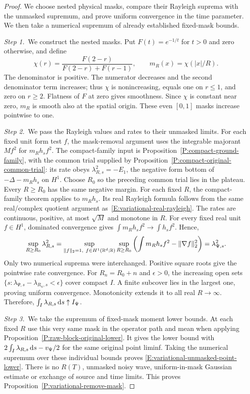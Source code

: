 \begin{proof}
  We choose nested physical masks, compare their Rayleigh suprema with the
  unmasked supremum, and prove uniform convergence in the time parameter. We
  then take a numerical supremum of already established fixed-mask bounds.


  \medskip
  \noindent\textit{Step 1.~}We construct the nested masks.
  Put $F(t) = e^{-1/t}$ for $t > 0$ and zero otherwise, and define
  \[
    \chi(r)=\frac{F(2-r)}{F(2-r)+F(r-1)},\qquad
    m_R(x)=\chi(|x|/R).
  \]
  The denominator is positive. The numerator decreases and the second
  denominator term increases; thus $\chi$ is nonincreasing, equals one on $r \le
  1$, and zero on $r \ge 2$. Flatness of $F$ at zero gives smoothness. Since
  $\chi$ is constant near zero, $m_R$ is smooth also at the spatial origin.
  These even $[0,1]$ masks increase pointwise to one.


  \medskip
  \noindent\textit{Step 2.~}We pass the Rayleigh values and rates to their
  unmasked limits.
  For each fixed unit form test $f$, the mask-removal argument uses the
  integrable majorant $Mf^2$ for $m_Rh_sf^2$.
  The compact-family input is Proposition~\ref{P:compact-ground-family}, with
  the common trial supplied by
  Proposition~\ref{P:compact-original-common-trial}: its rate obeys
  $\lambda_{R,s}^2=-E_1$, the negative form bottom of $-\Delta-m_Rh_s$ on
  $H^1$.
  Choose $R_0$ so the preceding common trial lies in the plateau. Every $R \ge
  R_0$ has the same negative margin. For each fixed $R$, the compact-family
  theorem applies to $m_Rh_s$. Its real Rayleigh formula follows from the same
  real/complex quotient argument as~\eqref{E:variational-real-rayleigh}. The
  rates are continuous, positive, at most $\sqrt M$ and monotone in $R$. For
  every fixed real unit $f \in H^1$, dominated convergence gives $\int m_Rh_sf^2
  \to \int h_sf^2$. Hence,
  \[
    \sup_{R\ge R_0}\lambda_{R,s}^2
    =\sup_{\|f\|_2=1,\ f\in H^1(\mathbb{R}^d;\mathbb{R})}
    \sup_{R\ge R_0}
    \left(\int m_Rh_sf^2-\|\nabla f\|_2^2\right)
    =\lambda_{\Psi,s}^2.
  \]
  Only two numerical suprema were interchanged. Positive square roots give the
  pointwise rate convergence. For $R_n = R_0+n$ and $\epsilon > 0$, the
  increasing open sets $\{s:\lambda_{\Psi,s}-\lambda_{R_n,s}<\epsilon\}$ cover
  compact $I$. A finite subcover lies in the largest one, proving uniform
  convergence. Monotonicity extends it to all real $R \to \infty$. Therefore,
  $\int_I\lambda_{R,s}\,\mathrm{d} s\uparrow I_\Psi$.


  \medskip
  \noindent\textit{Step 3.~}We take the supremum of fixed-mask moment lower
  bounds.
  At each fixed $R$ use this very same mask in the operator path and mean when
  applying Proposition~\ref{P:raw-block-original-lower}. It gives the lower
  bound with $2\int_I\lambda_{R,s}\,\mathrm{d} s-v_\Psi/2$ for the same original point
  liminf. Taking the numerical supremum over these individual bounds proves
  \eqref{E:variational-unmasked-point-lower}. There is no $R(T)$, unmasked noisy
  wave, uniform-in-mask Gaussian estimate or exchange of source and time limits.
  This proves Proposition~\ref{P:variational-remove-mask}.
\end{proof}

